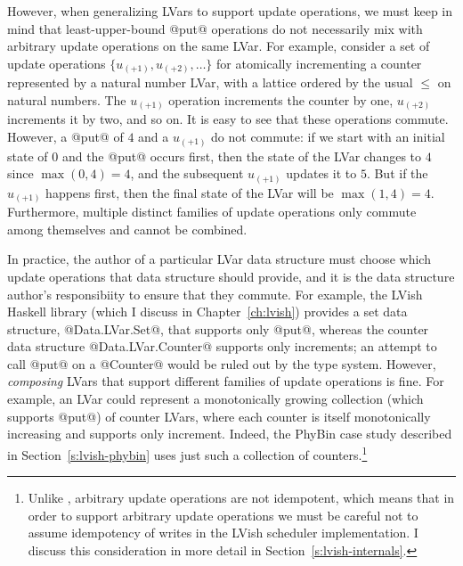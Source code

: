 
However, when generalizing LVars to support update operations, we must
keep in mind that least-upper-bound @put@ operations do not
necessarily mix with arbitrary update operations on the same LVar.
For example, consider a set of update operations $\{ u_{(+1)},
u_{(+2)}, \dots \}$ for atomically incrementing a counter represented
by a natural number LVar, with a lattice ordered by the usual $\leq$
on natural numbers.  The $u_{(+1)}$ operation increments the counter
by one, $u_{(+2)}$ increments it by two, and so on.  It is easy to see
that these operations commute.  However, a @put@ of $4$ and a
$u_{(+1)}$ do not commute: if we start with an initial state of $0$
and the @put@ occurs first, then the state of the LVar changes to $4$
since $\max(0, 4) = 4$, and the subsequent $u_{(+1)}$ updates it to
$5$.  But if the $u_{(+1)}$ happens first, then the final state of the
LVar will be $\max(1, 4) = 4$.  Furthermore, multiple distinct
families of update operations only commute among themselves and cannot
be combined.

In practice, the author of a particular LVar data structure must
choose which update operations that data structure should provide, and
it is the data structure author's responsibiity to ensure that they
commute.  For example, the LVish Haskell library (which I discuss in
Chapter~\ref{ch:lvish}) provides a set data structure,
@Data.LVar.Set@, that supports only @put@, whereas the counter data
structure @Data.LVar.Counter@ supports only increments; an attempt to
call @put@ on a @Counter@ would be ruled out by the type system.
However, \emph{composing} LVars that support different families of
update operations is fine.  For example, an LVar could represent a
monotonically growing collection (which supports @put@) of counter
LVars, where each counter is itself monotonically increasing and
supports only increment.  Indeed, the PhyBin case study described in
Section~\ref{s:lvish-phybin} uses just such a collection of
counters.\footnote{Unlike , arbitrary update operations are
  not idempotent, which means that in order to support arbitrary
  update operations we must be careful not to assume idempotency of
  writes in the LVish scheduler implementation.  I discuss this
  consideration in more detail in Section~\ref{s:lvish-internals}.}

